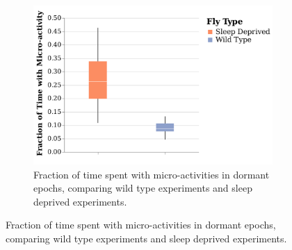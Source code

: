 \begin{figure}[ht!]
	\centering
	\begin{subfigure}[b]{0.45\linewidth}
		\centering
		\includegraphics[width=\linewidth]{figures/FractionTime-Microactivity.pdf}
		\caption{Fraction of time spent with micro-activities in dormant epochs, comparing wild type experiments and sleep deprived experiments.}
	\end{subfigure}%

\end{figure}
